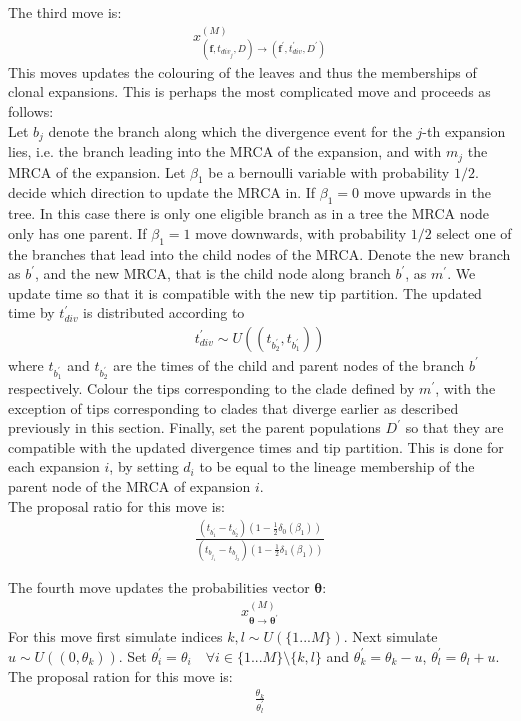 \documentclass{report}
\theoremstyle{definition}
\begin{document}
The third move is:
\begin{gather}
x^{(M)}_{\left(\mathbf{f}, t_{div_j}, D\right)\to \left(\mathbf{f}^{'}, t_{div}^{'}, D^{'}\right)}
\end{gather} 
This moves updates the colouring of the leaves and thus the memberships of clonal expansions. This is perhaps the most complicated move and proceeds as follows: \\
Let $b_j$ denote the branch along which the divergence event for the $j$-th expansion lies, i.e. the branch leading into the MRCA of the expansion, and with $m_j$ the MRCA of the expansion. Let $\beta_1$ be a bernoulli variable with probability $1/2$. decide which direction to update the MRCA in. If $\beta_1=0$ move upwards in the tree. In this case there is only one eligible branch as in a tree the MRCA node only has one parent. If $\beta_1 = 1$ move downwards, with probability $1/2$ select one of the branches that lead into the child nodes of the MRCA. Denote the new branch as $b^{'}$, and the new MRCA, that is the child node along branch $b^{'}$, as $m^{'}$.
We update time so that it is compatible with the new tip partition. The updated time by $t_{div}^{'}$ is distributed according to
\begin{gather}
t_{div}^{'}\sim U((t_{b^{'}_2}, t_{b^{'}_1}))
\end{gather}
where $t_{b^{'}_1}$ and $t_{b^{'}_2}$ are the times of the child and parent nodes of the branch $b^{'}$ respectively. 
Colour the tips corresponding to the clade defined by $m^{'}$, with the exception of tips corresponding to clades that diverge earlier as described previously in this section.
Finally, set the parent populations $D^{'}$ so that they are compatible with the updated divergence times and tip partition. This is done for each expansion $i$, by setting $d_i$ to be equal to the lineage membership of the parent node of the MRCA of expansion $i$.\\
The proposal ratio for this move is:
\begin{gather}
\frac{\left(t_{b^{'}_1}-t_{b^{'}_2}\right)\left(1-\frac{1}{2}\delta_0\left(\beta_1\right)\right)}{\left(t_{b_{j_1}} - t_{b_{j_2}}\right)\left(1-\frac{1}{2}\delta_1\left(\beta_1\right)\right)}
\end{gather}

The fourth move updates the probabilities vector $\pmb \theta$:
\begin{gather}
  x^{(M)}_{\pmb\theta\to \pmb\theta^{'}}
\end{gather}
For this move first simulate indices $k, l\sim U(\{1...M\})$. Next simulate $u\sim U((0, \theta_k))$. Set $\theta^{'}_i = \theta_i \quad\forall i \in \{1...M\}\setminus\{k,l\}$ and $\theta^{'}_k = \theta_k-u$, $\theta^{'}_l = \theta_l+u$.\\
The proposal ration for this move is:
\begin{gather}
\frac{\theta_k}{\theta^{'}_l}
\end{gather}
\end{document}
